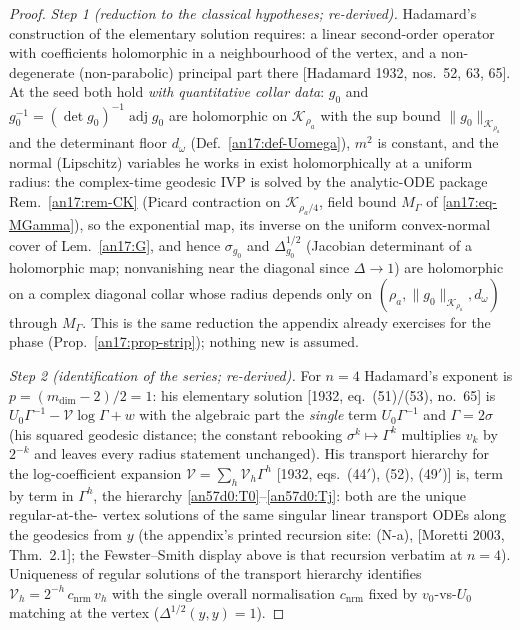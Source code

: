 \begin{proof}
\emph{Step 1 (reduction to the classical hypotheses; re-derived).} Hadamard's
construction of the elementary solution requires: a linear second-order
operator with coefficients holomorphic in a neighbourhood of the vertex, and
a non-degenerate (non-parabolic) principal part there [Hadamard 1932,
nos.~52, 63, 65]. At the seed both hold \emph{with quantitative collar
data}: $g_0$ and $g_0^{-1}=(\det g_0)^{-1}\operatorname{adj}g_0$ are
holomorphic on $\mathcal K_{\rho_a}$ with the sup bound
$\|g_0\|_{\mathcal K_{\rho_a}}$ and the determinant floor $d_\omega$
(Def.~\ref{an17:def-Uomega}), $m^2$ is constant, and the normal
(Lipschitz) variables he works in exist holomorphically at a uniform radius:
the complex-time geodesic IVP is solved by the analytic-ODE package
Rem.~\ref{an17:rem-CK} (Picard contraction on $\mathcal K_{\rho_a/4}$, field
bound $M_\Gamma$ of \eqref{an17:eq-MGamma}), so the exponential map, its
inverse on the uniform convex-normal cover of Lem.\ \ref{an17:G}, and hence
$\sigma_{g_0}$ and $\Delta^{1/2}_{g_0}$ (Jacobian determinant of a
holomorphic map; nonvanishing near the diagonal since $\Delta\to1$) are
holomorphic on a complex diagonal collar whose radius depends only on
$(\rho_a,\|g_0\|_{\mathcal K_{\rho_a}},d_\omega)$ through $M_\Gamma$. This
is the same reduction the appendix already exercises for the phase
(Prop.~\ref{an17:prop-strip}); nothing new is assumed.

\emph{Step 2 (identification of the series; re-derived).} For $n=4$
Hadamard's exponent is $p=(m_{\dim}-2)/2=1$: his elementary solution
[1932, eq.~(51)/(53), no.~65] is $U_0\Gamma^{-1}-\mathcal V\log\Gamma+w$
with the algebraic part the \emph{single} term $U_0\Gamma^{-1}$ and
$\Gamma=2\sigma$ (his squared geodesic distance; the constant rebooking
$\sigma^k\mapsto\Gamma^k$ multiplies $v_k$ by $2^{-k}$ and leaves every
radius statement unchanged). His transport hierarchy for the log-coefficient
expansion $\mathcal V=\sum_h\mathcal V_h\Gamma^h$ [1932, eqs.~(44$'$), (52),
(49$'$)] is, term by term in $\Gamma^h$, the hierarchy
\eqref{an57d0:T0}--\eqref{an57d0:Tj}: both are the unique regular-at-the-%
vertex solutions of the same singular linear transport ODEs along the
geodesics from $y$ (the appendix's printed recursion site: (N-a),
[Moretti 2003, Thm.~2.1]; the Fewster--Smith display above is that recursion
verbatim at $n=4$). Uniqueness of regular solutions of the transport
hierarchy identifies $\mathcal V_h=2^{-h}\,c_{\mathrm{nrm}}\,v_h$ with the
single overall normalisation $c_{\mathrm{nrm}}$ fixed by
$v_0$-vs-$U_0$ matching at the vertex ($\Delta^{1/2}(y,y)=1$).


\end{proof}
